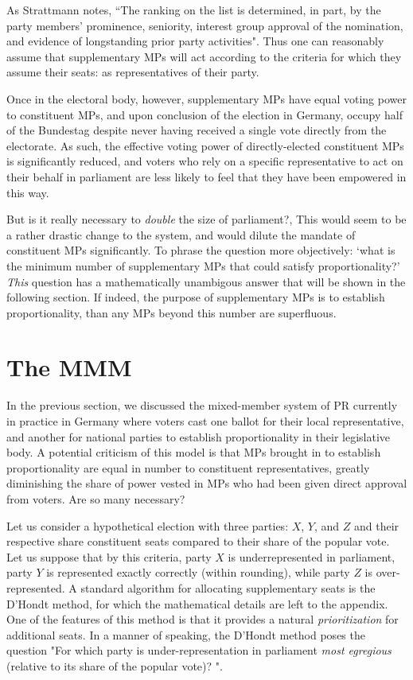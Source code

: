 \documentclass[DIV=calc, paper=a4, fontsize=11pt, twocolumn]{scrartcl}	 %
\begin{document}
As Strattmann notes\cite{Stratmann}, ``The ranking on the list is determined, in part, by the party members' prominence, seniority, interest group approval of the nomination, and evidence of longstanding prior party activities". 
Thus one can reasonably assume that supplementary MPs will act according to the criteria for which they assume their seats: as representatives of their party.

Once in the electoral body, however, supplementary MPs have equal voting power to constituent MPs, and upon conclusion of the election in Germany, occupy half of the Bundestag despite never having received a single vote directly from the electorate. As such, the effective voting power of directly-elected constituent MPs is significantly reduced, and voters who rely on a specific representative to act on their behalf in parliament are less likely to feel that they have been empowered in this way. 

But is it really necessary to \emph{double} the size of parliament?, This would seem to be a rather drastic change to the system, and would dilute the mandate of constituent MPs significantly. To phrase the question more objectively: `what is the minimum number of supplementary MPs that could satisfy proportionality?' 
\emph{This} question has a mathematically unambigous answer that will be shown in the following section. If indeed, the purpose of supplementary MPs is to establish proportionality, than any MPs beyond this number are superfluous.

\section{The MMM}
\label{sec:model_proposal}

In the previous section, we discussed the mixed-member system of PR currently in practice in Germany where voters cast one ballot for their local representative, and another for national parties to establish proportionality in their legislative body.
A potential criticism of this model is that MPs brought in to establish proportionality are equal in number to constituent representatives, greatly diminishing the share of power vested in MPs who had been given direct approval from voters. Are so many necessary?

Let us consider a hypothetical election with three parties: $X$, $Y$, and $Z$ and their respective share constituent seats compared to their share of the popular vote. Let us suppose that by this criteria, party $X$ is underrepresented in parliament, party $Y$ is represented exactly correctly (within rounding), while party $Z$ is over-represented. 
A standard algorithm for allocating supplementary seats is the D'Hondt method, for which the mathematical details are left to the appendix. One of the features of this method is that it provides a natural \emph{prioritization} for additional seats. In a manner of speaking, the D'Hondt method poses the question "For which party is under-representation in parliament \emph{most egregious} (relative to its share of the popular vote)? ". 
\end{document}
